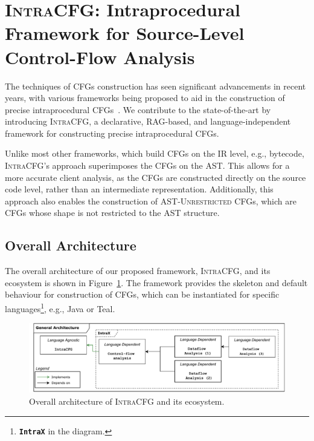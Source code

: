 \section{\textsc{IntraCFG}: Intraprocedural Framework for Source-Level Control-Flow Analysis}%
\label{sec:IntraCFG}
The techniques of CFGs construction has seen significant advancements
in recent years, with various frameworks being proposed to aid in the construction
of precise intraprocedural CFGs~\cite{smits2020flowspec,10.1016/j.scico.2012.02.002}.
We contribute to the state-of-the-art by introducing \textsc{IntraCFG}, a declarative, RAG-based,
and language-independent framework for constructing precise intraprocedural CFGs.

Unlike most other frameworks, which build CFGs on the IR level,
e.g.,  bytecode, \textsc{IntraCFG}'s approach superimposes the CFGs
on the AST. This allows for a more accurate client analysis,
as the CFGs are constructed directly on the source code level, rather than an
intermediate representation. Additionally, this approach also enables the construction
of \textsc{AST-Unrestricted} CFGs, which are CFGs whose shape is not restricted to the AST structure.
\subsection{Overall Architecture}
The overall architecture of our proposed framework, \textsc{IntraCFG}, and its
ecosystem is shown in Figure~\ref{fig:intraCFG}.
The framework provides the skeleton and default behaviour for construction of CFGs,
which can be instantiated for specific languages\footnote{\textbf{\texttt{IntraX}} in the diagram.}, e.g., Java or Teal.
\begin{figure}[H]
    \centering
    \includegraphics[width=1\textwidth]{kappa/img/architecture.pdf}
    \caption{\label{fig:intraCFG} Overall architecture of \textsc{IntraCFG} and its ecosystem.}
\end{figure}

